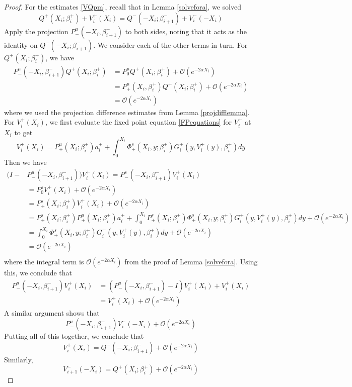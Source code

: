 \documentclass[thesis.tex]{subfiles}
\begin{document}
\begin{lemma}
\begin{proof}
For the estimates \eqref{VQpm}, recall that in Lemma \ref{solvefora}, we solved
\[
Q^+(X_i; \beta_i^+) + V_i^+(X_i) = Q^-(-X_i; \beta_{i+1}^-) + V_i^-(-X_i)
\]
Apply the projection $P^u_-(-X_i, \beta_{i+1}^-)$ to both sides, noting that it acts as the identity on $Q^-(-X_i; \beta_{i+1}^-)$. We consider each of the other terms in turn. For $Q^+(X_i; \beta_i^+)$, we have
\begin{align*}
P^u_-(-X_i, \beta_{i+1}^-) Q^+(X_i; \beta_i^+)
&= P^u_0 Q^+(X_i; \beta_i^+) + \mathcal{O}(e^{-2 \alpha X_i}) \\
&= P^u_+(X_i, \beta_i^+) Q^+(X_i; \beta_i^+) + \mathcal{O}(e^{-2 \alpha X_i}) \\
&= \mathcal{O}(e^{-2 \alpha X_i})
\end{align*}
where we used the projection difference estimates from Lemma \ref{projdifflemma}. For $V_i^+(X_i)$, we first evaluate the fixed point equation \eqref{FPequations} for $V_i^+$ at $X_i$ to get
\[
V_i^+(X_i) = P^u_+(X_i; \beta_i^+) a_i^+ 
+ \int_0^{X_i} \Phi_+^s(X_i, y; \beta_i^+) G_i^+(y, V_i^+(y),\beta_i^+)dy
\]
Then we have
\begin{align*}
(I - &P^u_-(-X_i, \beta_{i+1}^-)) V_i^+(X_i) = 
P^s_-(-X_i, \beta_{i+1}^-) V_i^+(X_i) \\
&= P_0^s V_i^+(X_i) + \mathcal{O}(e^{-2 \alpha X_i}) \\
&= P^s_+(X_i; \beta_i^+) V_i^+(X_i) + \mathcal{O}(e^{-2 \alpha X_i}) \\
&= P^s_+(X_i; \beta_i^+) P^u_+(X_i; \beta_i^+) a_i^+ 
+ \int_0^{X_i} P^s_+(X_i; \beta_i^+) \Phi_+^s(X_i, y; \beta_i^+) G_i^+(y, V_i^+(y),\beta_i^+)dy + \mathcal{O}(e^{-2 \alpha X_i}) \\
&= \int_0^{X_i} \Phi_+^s(X_i, y; \beta_i^+) G_i^+(y, V_i^+(y),\beta_i^+)dy + \mathcal{O}(e^{-2 \alpha X_i}) \\
&= \mathcal{O}(e^{-2 \alpha X_i}) \\
\end{align*}
where the integral term is $\mathcal{O}(e^{-2 \alpha X_i})$ from the proof of Lemma \ref{solvefora}. Using this, we conclude that
\begin{align*}
P^u_-(-X_i, \beta_{i+1}^-) V_i^+(X_i) &= 
(P^u_-(-X_i, \beta_{i+1}^-) - I)V_i^+(X_i) + V_i^+(X_i) \\
&= V_i^+(X_i) + \mathcal{O}(e^{-2 \alpha X_i})
\end{align*}
A similar argument shows that
\[
P^u_-(-X_i, \beta_{i+1}^-) V_i^-(-X_i) + \mathcal{O}(e^{-2 \alpha X_i})
\]
Putting all of this together, we conclude that
\begin{equation*}
V_i^+(X_i) = Q^-(-X_i; \beta_{i+1}^-) + \mathcal{O}(e^{-2 \alpha X_i})
\end{equation*}
Similarly,
\begin{equation*}
V_{i+1}^-(-X_i) = Q^+(X_i; \beta_i^+) + \mathcal{O}(e^{-2 \alpha X_i})
\end{equation*}
\end{proof}
\end{lemma}
\end{document}
